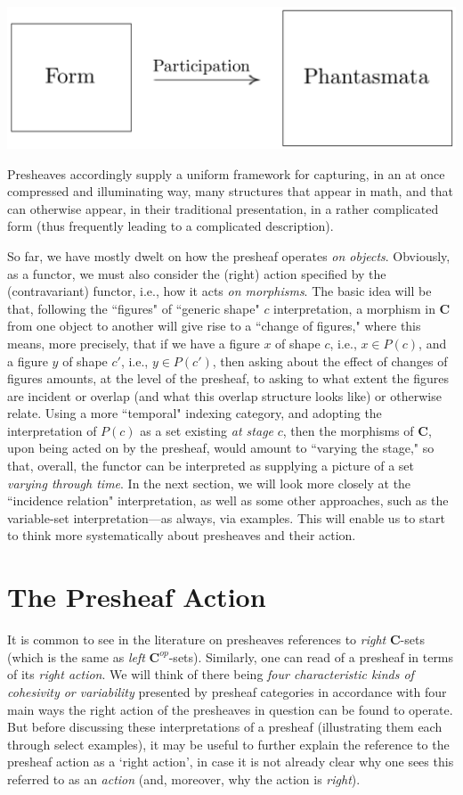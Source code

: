\documentclass[11pt]{book}
\theoremstyle{definition}
\theoremstyle{definition}
\theoremstyle{definition}
\theoremstyle{theorem}
\theoremstyle{definition}
\begin{document}
\begin{center}
	\includegraphics*[scale=0.23]{FormParticipation.png}
\end{center}
Presheaves accordingly supply a uniform framework for capturing, in an at once compressed and illuminating way, many structures that appear in math, and that can otherwise appear, in their traditional presentation, in a rather complicated form (thus frequently leading to a complicated description). \par   
So far, we have mostly dwelt on how the presheaf operates \textit{on objects}. Obviously, as a functor, we must also consider the (right) action specified by the (contravariant) functor, i.e., how it acts \textit{on morphisms}. The basic idea will be that, following the ``figures" of ``generic shape" $c$ interpretation, a morphism in \textbf{C} from one object to another will give rise to a ``change of figures," where this means, more precisely, that if we have a figure $x$ of shape $c$, i.e., $x \in P(c)$, and a figure $y$ of shape $c'$, i.e., $y \in P(c')$, then asking about the effect of changes of figures amounts, at the level of the presheaf, to asking to what extent the figures are incident or overlap (and what this overlap structure looks like) or otherwise relate. Using a more ``temporal" indexing category, and adopting the interpretation of $P(c)$ as a set existing \textit{at stage} $c$, then the morphisms of \textbf{C}, upon being acted on by the presheaf, would amount to ``varying the stage," so that, overall, the functor can be interpreted as supplying a picture of a set \textit{varying through time}. In the next section, we will look more closely at the ``incidence relation" interpretation, as well as some other approaches, such as the variable-set interpretation---as always, via examples. This will enable us to start to think more systematically about presheaves and their action.
\section{The Presheaf Action}
It is common to see in the literature on presheaves references to \textit{right} \textbf{C}-sets (which is the same as \textit{left} $\textbf{C}^{op}$-sets). Similarly, one can read of a presheaf in terms of its \textit{right action}. We will think of there being \textit{four characteristic kinds of cohesivity or variability} presented by presheaf categories in accordance with four main ways the right action of the presheaves in question can be found to operate. But before discussing these interpretations of a presheaf (illustrating them each through select examples), it may be useful to further explain the reference to the presheaf action as a `right action', in case it is not already clear why one sees this referred to as an \textit{action} (and, moreover, why the action is \textit{right}). 
\end{document}
